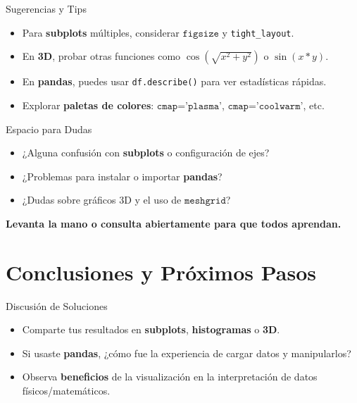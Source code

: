 \documentclass[10pt]{beamer}
\begin{document}
\begin{frame}{Sugerencias y Tips}
  \begin{itemize}
    \item Para \textbf{subplots} múltiples, considerar \(\texttt{figsize}\) y \texttt{tight\_layout}.
    \item En \textbf{3D}, probar otras funciones como \(\cos(\sqrt{x^2 + y^2})\) o \(\sin(x*y)\).
    \item En \textbf{pandas}, puedes usar \texttt{df.describe()} para ver estadísticas rápidas.
    \item Explorar \textbf{paletas de colores}: \(\texttt{cmap='plasma'}\), \(\texttt{cmap='coolwarm'}\), etc.
  \end{itemize}
\end{frame}

\begin{frame}{Espacio para Dudas}
  \begin{itemize}
    \item ¿Alguna confusión con \textbf{subplots} o configuración de ejes?
    \item ¿Problemas para instalar o importar \textbf{pandas}?
    \item ¿Dudas sobre gráficos 3D y el uso de \(\texttt{meshgrid}\)?
  \end{itemize}
  \vspace{0.2cm}
  \textbf{Levanta la mano o consulta abiertamente para que todos aprendan.}
\end{frame}

\section{Conclusiones y Próximos Pasos}

\begin{frame}{Discusión de Soluciones}
  \begin{itemize}
    \item Comparte tus resultados en \textbf{subplots}, \textbf{histogramas} o \textbf{3D}.
    \item Si usaste \textbf{pandas}, ¿cómo fue la experiencia de cargar datos y manipularlos?
    \item Observa \textbf{beneficios} de la visualización en la interpretación de datos físicos/matemáticos.
  \end{itemize}
\end{frame}
\end{document}
